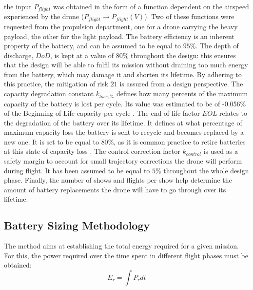 the input $P_{\mathit{flight}}$ was obtained in the form of a function dependent on the airspeed experienced by the drone ($P_{\mathit{flight}} \rightarrow P_{\mathit{flight}}(V)$). Two of these functions were requested from the propulsion department, one for a drone carrying the heavy payload, the other for the light payload. The battery efficiency is an inherent property of the battery, and can be assumed to be equal to $95\%$. The depth of discharge, $\mathit{DoD}$, is kept at a value of $80\%$ throughout the design: this ensures that the design will be able to fulfil its mission without draining too much energy from the battery, which may damage it and shorten its lifetime. By adhering to this practice, the mitigation of risk $21$ is assured from a design perspective. The capacity degradation constant $k_{\mathit{loss,\%}}$ defines how many percents of the maximum capacity of the battery is lost per cycle. Its value was estimated to be of -0.056\% of the Beginning-of-Life capacity per cycle \cite{BU_how_to_prolong_lithium_based_batteries}. The end of life factor $\mathit{EOL}$ relates to the degradation of the battery over its lifetime. It defines at what percentage of maximum capacity loss the battery is sent to recycle and becomes replaced by a new one. It is set to be equal to $80 \%$, as it is common practice to retire batteries at this state of capacity loss \cite{battery_life_and_how_to_improve_it}. The control correction factor $k_{\mathit{control}}$ is used as a safety margin to account for small trajectory corrections the drone will perform during flight. It has been assumed to be equal to $5\%$ throughout the whole design phase. Finally, the number of shows and flights per show help determine the amount of battery replacements the drone will have to go through over its lifetime.


\subsection{Battery Sizing Methodology} %
\label{sub:Power_tool}


The method aims at establishing the total energy required for a given mission. For this, the power required over the time spent in different flight phases must be obtained:
\begin{equation}
    E_{\mathit{r}} = \int P_{\mathit{r}} dt
\end{equation}

